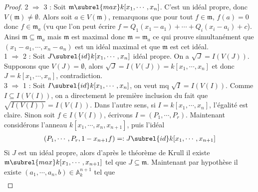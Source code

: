         \begin{proof}
            2 $\Rightarrow$ 3 : Soit $\mathfrak{m} \subrel{max} k[x_1, \cdots, x_n]$. C'est un idéal propre, donc $V(\mathfrak{m}) \neq \emptyset$. Alors soit $a \in V(\mathfrak{m})$, remarquons que pour tout $f \in \mathfrak{m}$, $f(a) = 0$ donc $f \in \mathfrak{m}_a$ (vu que l'on peut écrire $f = Q_1(x_1 - a_1) + \cdots + Q_i(x_i - a_i) + c$). Ainsi $\mathfrak{m} \subseteq \mathfrak{m}_a$ mais $\mathfrak{m}$ est maximal donc $\mathfrak{m} = \mathfrak{m}_a$ ce qui prouve simultanément que $(x_1 - a_1, \cdots, x_n - a_n)$ est un idéal maximal et que $\mathfrak{m}$ est cet idéal. \\
            1 $\Rightarrow$ 2 : Soit $J \subrel{id} k[x_1, \cdots, x_n]$ idéal propre. On a $\sqrt{J} = I(V(J))$. Supposons que $V(J) = \emptyset$, alors $\sqrt{J} = I(V(J)) = k[x_1, \cdots, x_n]$ et donc $J = k[x_1, \cdots, x_n]$, contradiction.\\
            3 $\Rightarrow$ 1 : Soit $I \subrel{id} k[x_1, \cdots, x_n]$, on veut mq $\sqrt{I} = I(V(I))$. Comme $I \subseteq I(V(I))$, on a directement le première inclusion du fait que $\sqrt{I(V(I))} = I(V(I))$. Dans l'autre sens, si $I = k[x_1, \cdots, x_n]$, l'égalité est claire. Sinon soit $f \in I(V(I))$, écrivons $I = (P_1, \cdots, P_r)$. Maintenant considérons l'anneau $k[x_1, \cdots, x_n, x_{n+1}]$, puis l'idéal
            \begin{align*}
                (P_1, \cdots, P_r, 1 - x_{n+1}f) =: J \subrel{id} k[x_1, \cdots, x_{n+1}]
            \end{align*}
            Si $J$ est un idéal propre, alors d'après le théorème de Krull il existe $\mathfrak{m} \subrel{max} k[x_1, \cdots, x_{n+1}]$ tel que $J \subseteq \mathfrak{m}$. Maintenant par hypothèse il existe $(a_1, \cdots, a_n, b) \in \mathbb{A}_k^{n+1}$ tel que
            \begin{align*}

\end{align*}
\end{proof}
